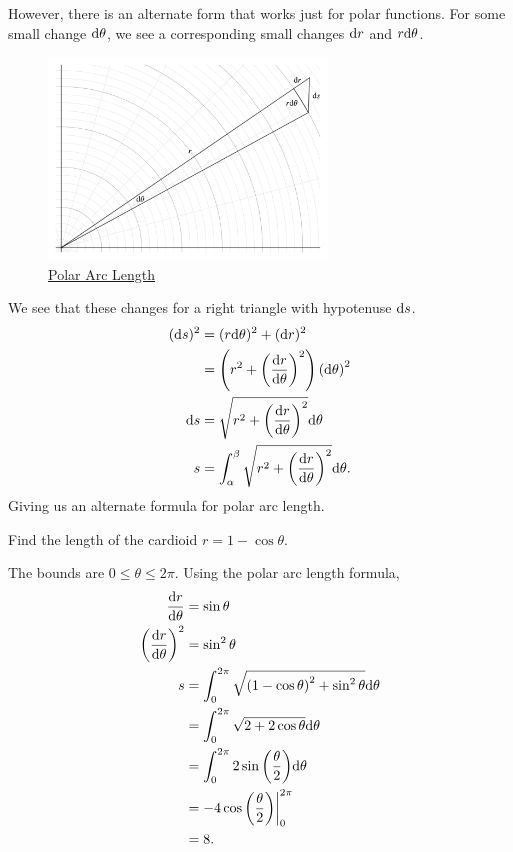 \noindent
However, there is an alternate form that works just for polar functions.
For some small change $\mathrm{d} \theta$, we see a corresponding small changes $\mathrm{d} r$ and $r\mathrm{d} \theta$.
\begin{figure}[H]
	\label{polar_area}
	\centering
	\includegraphics[width=0.66\textwidth]{./parametric_vector_polar/polar_length.png}
	\caption{\hyperref{}{}{}{Polar Arc Length}}
\end{figure}
We see that these changes for a right triangle with hypotenuse $\mathrm{d} s$.
\begin{align*}
	(\mathrm{d} s)^2 &= (r\mathrm{d} \theta)^2 + (\mathrm{d} r)^2 \\
	&= \left(r^2 + \left(\frac{\mathrm{d} r}{\mathrm{d} \theta}\right)^2\right)\left(\mathrm{d} \theta\right)^2 \\
	\mathrm{d} s &= \sqrt{r^2 + \left(\frac{\mathrm{d} r}{\mathrm{d} \theta}\right)^2}\mathrm{d} \theta \\
	s &= \int_{\alpha}^{\beta}{\sqrt{r^2 + \left(\frac{\mathrm{d} r}{\mathrm{d} \theta}\right)^2}\mathrm{d} \theta}.
\end{align*}
\noindent
Giving us an alternate formula for polar arc length.

\begin{example}
	Find the length of the cardioid $r=1-\cos{\theta}$.
\end{example}
The bounds are $0 \leq \theta \leq 2\pi$.
Using the polar arc length formula,
\begin{align*}
	\frac{\mathrm{d} r}{\mathrm{d} \theta} &= \sin{\theta} \\
	\left(\frac{\mathrm{d} r}{\mathrm{d} \theta}\right)^2 &= \sin^2{\theta} \\
	s &= \int_{0}^{2\pi}{\sqrt{\left(1-\cos{\theta}\right)^2+\sin^2{\theta}}\mathrm{d} \theta} \\
	&= \int_{0}^{2\pi}{\sqrt{2+2\cos{\theta}}\mathrm{d} \theta} \\
	&= \int_{0}^{2\pi}{2\sin{\left(\frac{\theta}{2}\right)}\mathrm{d} \theta} \\
	&= -4\cos{\left(\frac{\theta}{2}\right)}\biggr\rvert_{0}^{2\pi} \\
	&= 8.
\end{align*}
